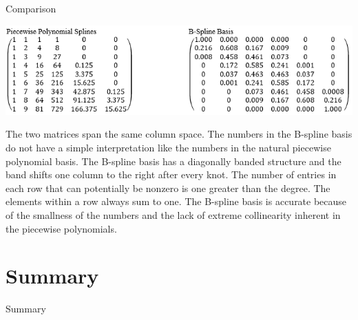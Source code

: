 \documentclass[
  9pt,
  ignorenonframetext,
]{beamer}
\begin{document}
\begin{frame}{}
\protect\hypertarget{section-20}{}
\begin{block}{Comparison}
\protect\hypertarget{comparison}{}
\begin{center}\includegraphics[width=1\linewidth]{figs_L12/f24} \end{center}

The two matrices span the same column space. The numbers in the B-spline
basis do not have a simple interpretation like the numbers in the
natural piecewise polynomial basis. The B-spline basis has a diagonally
banded structure and the band shifts one column to the right after every
knot. The number of entries in each row that can potentially be nonzero
is one greater than the degree. The elements within a row always sum to
one. The B-spline basis is accurate because of the smallness of the
numbers and the lack of extreme collinearity inherent in the piecewise
polynomials.
\end{block}
\end{frame}

\hypertarget{summary}{%
\section{Summary}\label{summary}}

\begin{frame}{Summary}
\protect\hypertarget{summary-1}{}
\end{frame}
\end{document}

